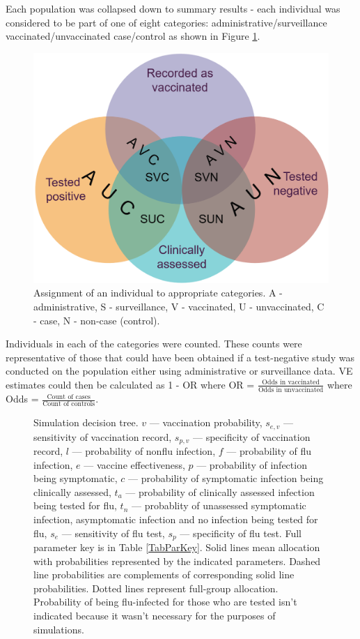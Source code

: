 \documentclass[11pt]{article}
\begin{document}
Each population was collapsed down to summary results - each individual was considered to be part of one of eight categories: administrative/surveillance vaccinated/unvaccinated case/control as shown in Figure \ref{PopAgg}.

\begin{figure}[h]
	\centering
		\includegraphics[width=0.5\linewidth]{../sim-diag/popagg-venn.png}
		\caption{
Assignment of an individual to appropriate categories. A - administrative, S - surveillance, V - vaccinated, U - unvaccinated, C - case, N - non-case (control). \label{PopAgg}
		}
\end{figure}

Individuals in each of the categories were counted. These counts were representative of those that could have been obtained if a test-negative study was conducted on the population either using administrative or surveillance data. VE estimates could then be calculated as 1 - OR where OR = $\frac{\text{Odds in vaccinated}}{\text{Odds in unvaccinated}}$ where Odds = $\frac{\text{Count of cases}}{\text{Count of controls}}$.

\pagebreak

\begin{figure}[H]
	\centering
		
		\caption{
Simulation decision tree. $v$ --- vaccination probability, $s_{e,v}$ --- sensitivity of vaccination record, $s_{p,v}$ --- specificity of vaccination record, $l$ --- probability of nonflu infection, $f$ --- probability of flu infection, $e$ --- vaccine effectiveness, $p$ --- probability of infection being symptomatic, $c$ --- probability of symptomatic infection being clinically assessed, $t_a$ --- probability of clinically assessed infection being tested for flu, $t_n$ --- probablity of unassessed symptomatic infection, asymptomatic infection and no infection being tested for flu, $s_e$ --- sensitivity of flu test, $s_p$ --- specificity of flu test. Full parameter key is in Table \ref{TabParKey}. Solid lines mean allocation with probabilities represented by the indicated parameters. Dashed line probabilities are complements of corresponding solid line probabilities. Dotted lines represent full-group allocation. Probability of being flu-infected for those who are tested isn't indicated because it wasn't necessary for the purposes of simulations. \label{SimDiag}
		}
\end{figure}
\end{document}
